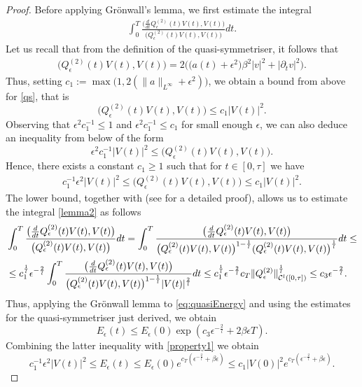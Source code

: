 \documentclass[12pt,oneside,a4paper]{book}
\numberwithin{equation}{section}     %
\theoremstyle{plain}
\theoremstyle{definition}
\begin{document}
\begin{proof}
	Before applying Gr\"onwall's lemma, we first estimate the integral
	\begin{align}\label{lemma2}
	\int_0^T\frac{\big(\frac{d}{dt}Q_\epsilon^{(2)}(t)V(t),V(t)\big)}{\big(Q_\epsilon^{(2)}(t)V(t),V(t)\big)}dt.
	\end{align}
	Let us recall that from the definition of the quasi-symmetriser, it follows that
	\begin{align}\label{qs}
	\Big( Q_\epsilon^{(2)}(t)V(t),V(t)\Big)=2\big(\big(a(t)+\epsilon^2\big)\beta^2|v|^2+|\partial_t v|^2\big).
	\end{align} 
	Thus, setting $c_1:=\max\big(1, 2(\|a\|_{L^\infty}+\epsilon^2)\big)$, we obtain a bound from above for \eqref{qs}, that is
	\[
	\Big( Q_\epsilon^{(2)}(t)V(t),V(t)\Big)\leq c_1 |V(t)|^2.
	\]
	Observing that $\epsilon^2c_1^{-1}\leq 1$ and $\epsilon^2c_1^{-1}\leq c_1$ for small enough $\epsilon$, we can also deduce an inequality from below of the form
	\[
	\epsilon^2c_1^{-1}|V(t)|^2\leq \Big( Q_\epsilon^{(2)}(t)V(t),V(t)\Big).
	\]
	Hence, there exists a constant $c_1\geq 1$ such that for $t\in[0,\tau]$ we have
	\begin{align}\label{property1}
	c_1^{-1}\epsilon^2|V(t)|^2\leq \big(Q_\epsilon^{(2)}(t)V(t),V(t)\big)\leq c_1 |V(t)|^2.
	\end{align}
	The lower bound, together with \cite[Lemma 2]{GR2013} (see \cite[Lemma 2]{KS2006} for a detailed proof), allows us to estimate the integral \eqref{lemma2} as follows
	\begin{align}\notag
	&\int_0^T\frac{\big(\frac{d}{dt}Q_\epsilon^{(2)}(t)V(t),V(t)\big)}{\big(Q_\epsilon^{(2)}(t)V(t),V(t)\big)}dt =
	\int_0^T\frac{\big(\frac{d}{dt}Q_\epsilon^{(2)}(t)V(t),V(t)\big)}{\big(Q_\epsilon^{(2)}(t)V(t),V(t)\big)^{1-\frac{1}{l}}(Q_\epsilon^{(2)}(t)V(t),V(t)\big)^\frac{1}{l}}dt\leq\\ \notag
	&\leq c_1^\frac{1}{l}\epsilon^{-\frac{2}{l}} \int_0^T\frac{\big(\frac{d}{dt}Q_\epsilon^{(2)}(t)V(t),V(t)\big)}{\big(Q_\epsilon^{(2)}(t)V(t),V(t)\big)^{1-\frac{1}{l}}|V(t)|^\frac{2}{l}}dt \leq c_1^\frac{1}{l}\epsilon^{-\frac{2}{l}} c_T\|Q_\epsilon^{(2)}\|^{\frac{1}{l}}_{\mathcal C^l([0,\tau])}\leq c_3\epsilon^{-\frac{2}{l}}.
	\end{align}
	Thus, applying the Gr\"onwall lemma to \eqref{eq:quasiEnergy} and using the estimates for the quasi-symmetriser just derived, we obtain
	\[
	E_\epsilon(t)\leq E_\epsilon(0)\exp\left( c_3\epsilon^{-\frac{2}{l}}+2\beta\epsilon T\right).
	\]
	Combining the latter inequality with \eqref{property1} we obtain
	\[
	c_1^{-1}\epsilon^2 |V(t)|^2\leq E_\epsilon(t)\leq E_\epsilon(0)e^{c_T(\epsilon^{-\frac{2}{l}}+\beta\epsilon)} \leq c_1|V(0)|^2 e^{c_T(\epsilon^{-\frac{2}{l}}+\beta\epsilon)}.
\]
\end{proof}
\end{document}
